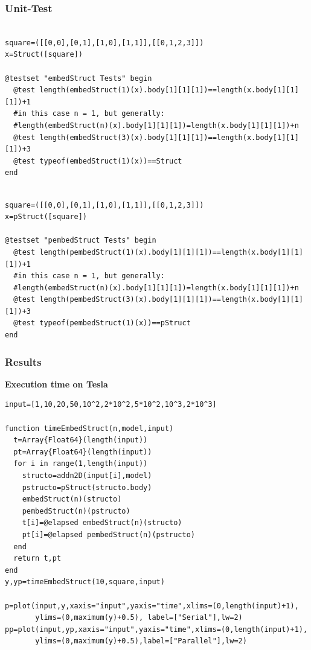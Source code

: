 \documentclass[a4paper,12pt]{article}
\begin{document}
\subsubsection{Unit-Test}
\begin{Verbatim}[fontsize=\footnotesize]

square=([[0,0],[0,1],[1,0],[1,1]],[[0,1,2,3]])
x=Struct([square])	

@testset "embedStruct Tests" begin
  @test length(embedStruct(1)(x).body[1][1][1])==length(x.body[1][1][1])+1
  #in this case n = 1, but generally: 
  #length(embedStruct(n)(x).body[1][1][1])=length(x.body[1][1][1])+n
  @test length(embedStruct(3)(x).body[1][1][1])==length(x.body[1][1][1])+3
  @test typeof(embedStruct(1)(x))==Struct	
end

\end{Verbatim}

\begin{Verbatim}[fontsize=\footnotesize]

square=([[0,0],[0,1],[1,0],[1,1]],[[0,1,2,3]])
x=pStruct([square])

@testset "pembedStruct Tests" begin
  @test length(pembedStruct(1)(x).body[1][1][1])==length(x.body[1][1][1])+1 
  #in this case n = 1, but generally: 
  #length(embedStruct(n)(x).body[1][1][1])=length(x.body[1][1][1])+n
  @test length(pembedStruct(3)(x).body[1][1][1])==length(x.body[1][1][1])+3
  @test typeof(pembedStruct(1)(x))==pStruct	
end

\end{Verbatim}
\subsubsection{Results}

\textbf{Execution time on Tesla}
\begin{Verbatim}[fontsize=\footnotesize]
input=[1,10,20,50,10^2,2*10^2,5*10^2,10^3,2*10^3]

function timeEmbedStruct(n,model,input)
  t=Array{Float64}(length(input))
  pt=Array{Float64}(length(input))
  for i in range(1,length(input))
    structo=addn2D(input[i],model)
    pstructo=pStruct(structo.body)
    embedStruct(n)(structo)
    pembedStruct(n)(pstructo)
    t[i]=@elapsed embedStruct(n)(structo)
    pt[i]=@elapsed pembedStruct(n)(pstructo)
  end
  return t,pt
end
y,yp=timeEmbedStruct(10,square,input)

p=plot(input,y,xaxis="input",yaxis="time",xlims=(0,length(input)+1),
       ylims=(0,maximum(y)+0.5), label=["Serial"],lw=2)       
pp=plot(input,yp,xaxis="input",yaxis="time",xlims=(0,length(input)+1),
       ylims=(0,maximum(y)+0.5),label=["Parallel"],lw=2)
\end{Verbatim}
\vspace{25px}
\end{document}

